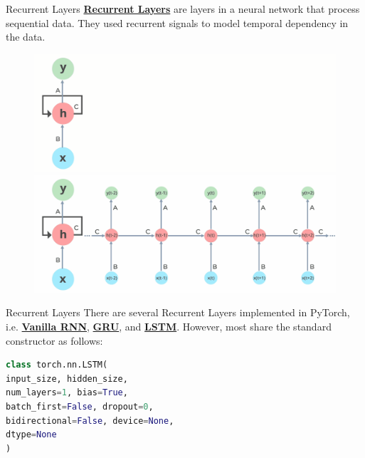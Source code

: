 \documentclass{beamer}
\begin{document}
\begin{frame}[fragile]{Recurrent Layers}
    \href{https://pytorch.org/docs/stable/nn.html#recurrent-layers}{\textbf{Recurrent Layers}} are layers in a neural network that process sequential data. They used recurrent signals to model temporal dependency in the data.
    \begin{figure}
        \begin{overprint}
            \centering\includegraphics[width=\textwidth,height=\textheight,keepaspectratio]{figures/RNN/frame_apngframe06.png}
            \centering\includegraphics[width=\textwidth,height=\textheight,keepaspectratio]{figures/RNN/frame_apngframe16.png}
        \end{overprint}
    \end{figure}
\end{frame}
\begin{frame}[fragile]{Recurrent Layers}
    There are several Recurrent Layers implemented in PyTorch, i.e. \href{https://pytorch.org/docs/stable/generated/torch.nn.RNN.html}{\textbf{Vanilla RNN}}, \href{https://pytorch.org/docs/stable/generated/torch.nn.GRU.html}{\textbf{GRU}}, and \href{https://pytorch.org/docs/stable/generated/torch.nn.LSTM.html}{\textbf{LSTM}}. However, most share the standard constructor as follows:
    \begin{exampleblock}{}
        \begin{lstlisting}[language=Python]
class torch.nn.LSTM(
input_size, hidden_size,
num_layers=1, bias=True,
batch_first=False, dropout=0,
bidirectional=False, device=None,
dtype=None
)
        \end{lstlisting}
    \end{exampleblock}
\end{frame}
\end{document}
